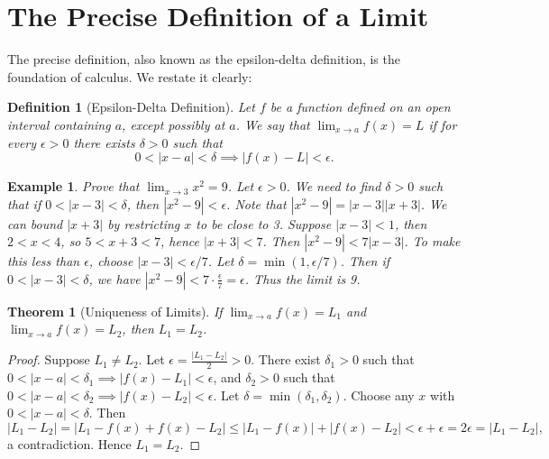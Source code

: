 \documentclass[11pt,a4paper]{article}
\newtheorem{example}{Example}
\newtheorem{theorem}{Theorem}
\newtheorem{definition}{Definition}
\begin{document}
\section{The Precise Definition of a Limit}
The precise definition, also known as the epsilon-delta definition, is the foundation of calculus. We restate it clearly:
\begin{definition}[Epsilon-Delta Definition]
Let $f$ be a function defined on an open interval containing $a$, except possibly at $a$. We say that $\lim_{x \to a} f(x) = L$ if for every $\epsilon > 0$ there exists $\delta > 0$ such that
\[
0 < |x - a| < \delta \implies |f(x) - L| < \epsilon.
\]
\end{definition}
\begin{example}
Prove that $\displaystyle \lim_{x \to 3} x^2 = 9$.
Let $\epsilon > 0$. We need to find $\delta > 0$ such that if $0 < |x - 3| < \delta$, then $|x^2 - 9| < \epsilon$. Note that $|x^2 - 9| = |x - 3||x + 3|$. We can bound $|x + 3|$ by restricting $x$ to be close to 3. Suppose $|x - 3| < 1$, then $2 < x < 4$, so $5 < x + 3 < 7$, hence $|x + 3| < 7$. Then $|x^2 - 9| < 7|x - 3|$. To make this less than $\epsilon$, choose $|x - 3| < \epsilon/7$. Let $\delta = \min(1, \epsilon/7)$. Then if $0 < |x - 3| < \delta$, we have $|x^2 - 9| < 7 \cdot \frac{\epsilon}{7} = \epsilon$. Thus the limit is 9.
\end{example}
\begin{theorem}[Uniqueness of Limits]
If $\lim_{x \to a} f(x) = L_1$ and $\lim_{x \to a} f(x) = L_2$, then $L_1 = L_2$.
\end{theorem}
\begin{proof}
Suppose $L_1 \neq L_2$. Let $\epsilon = \frac{|L_1 - L_2|}{2} > 0$. There exist $\delta_1 > 0$ such that $0 < |x - a| < \delta_1 \implies |f(x) - L_1| < \epsilon$, and $\delta_2 > 0$ such that $0 < |x - a| < \delta_2 \implies |f(x) - L_2| < \epsilon$. Let $\delta = \min(\delta_1, \delta_2)$. Choose any $x$ with $0 < |x - a| < \delta$. Then
\[
|L_1 - L_2| = |L_1 - f(x) + f(x) - L_2| \leq |L_1 - f(x)| + |f(x) - L_2| < \epsilon + \epsilon = 2\epsilon = |L_1 - L_2|,
\]
a contradiction. Hence $L_1 = L_2$.
\end{proof}
\end{document}
